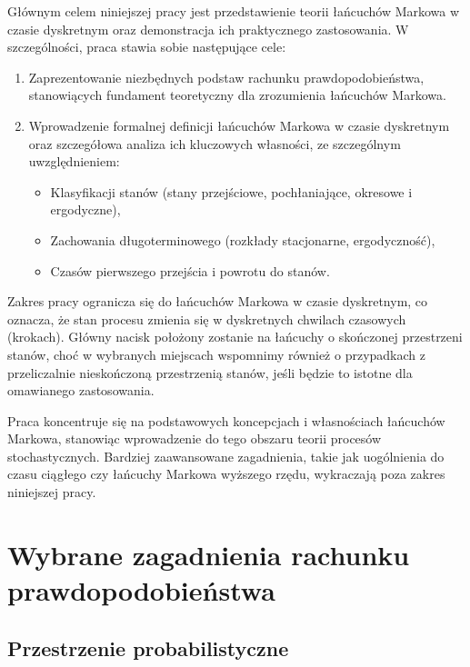 \documentclass[final,a4paper,openany,12pt]{mwbk}
\begin{document}
Głównym celem niniejszej pracy jest przedstawienie teorii łańcuchów Markowa w czasie dyskretnym oraz demonstracja ich praktycznego zastosowania. W szczególności, praca stawia sobie następujące cele:

\begin{enumerate}
    \item Zaprezentowanie niezbędnych podstaw rachunku prawdopodobieństwa, stanowiących fundament teoretyczny dla zrozumienia łańcuchów Markowa.
    
    \item Wprowadzenie formalnej definicji łańcuchów Markowa w czasie dyskretnym oraz szczegółowa analiza ich kluczowych własności, ze szczególnym uwzględnieniem:
    \begin{itemize}
        \item Klasyfikacji stanów (stany przejściowe, pochłaniające, okresowe i ergodyczne),
        \item Zachowania długoterminowego (rozkłady stacjonarne, ergodyczność),
        \item Czasów pierwszego przejścia i powrotu do stanów.
    \end{itemize}
    
\end{enumerate}

Zakres pracy ogranicza się do łańcuchów Markowa w czasie dyskretnym, co oznacza, że stan procesu zmienia się w dyskretnych chwilach czasowych (krokach). Główny nacisk położony zostanie na łańcuchy o skończonej przestrzeni stanów, choć w wybranych miejscach wspomnimy również o przypadkach z przeliczalnie nieskończoną przestrzenią stanów, jeśli będzie to istotne dla omawianego zastosowania.

Praca koncentruje się na podstawowych koncepcjach i własnościach łańcuchów Markowa, stanowiąc wprowadzenie do tego obszaru teorii procesów stochastycznych. Bardziej zaawansowane zagadnienia, takie jak uogólnienia do czasu ciągłego czy łańcuchy Markowa wyższego rzędu, wykraczają poza zakres niniejszej pracy.

\chapter{Wybrane zagadnienia rachunku prawdopodobieństwa}

\section{Przestrzenie probabilistyczne}
\end{document}
